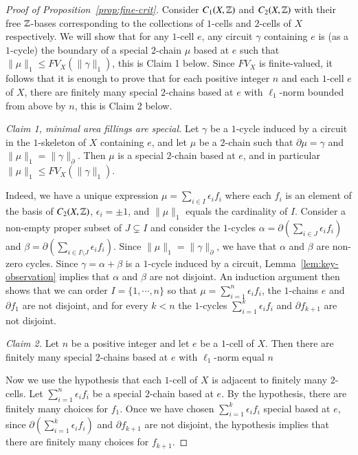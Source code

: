 \begin{proof}[Proof of Proposition~\ref{prop:fine-crit}] 
Consider $C_1(X, \mathbb{Z})$ and $C_2(X, \mathbb{Z})$ with their free $\mathbb{Z}$-bases corresponding to the collections of  $1$-cells and $2$-cells of $X$ respectively.
  We will show that for any  $1$-cell $e$,  any circuit $\gamma$ containing $e$ is (as a $1$-cycle) the boundary of a special $2$-chain $\mu$ based at $e$ such that $\|\mu\|_1\leq FV_X (\|\gamma\|_1)$, this is Claim 1 below. Since $FV_X$ is finite-valued,  it follows  that it is enough to prove that for each positive integer $n$ and each $1$-cell $e$ of $X$, there are finitely many special $2$-chains based at $e$ with $\ell_1$-norm bounded from above by $n$, this is Claim 2 below.

\emph{Claim 1, minimal area fillings are special.} Let $\gamma$ be a $1$-cycle induced by a circuit in the $1$-skeleton of $X$ containing $e$, and let  $\mu$ be a $2$-chain such that  $\partial \mu=\gamma$ and $\|\mu\|_1=\|\gamma\|_\partial $. Then $\mu$ is a special $2$-chain  based at $e$, and in particular $\|\mu\|_1\leq FV_X(\|\gamma\|_1)$.   


Indeed, we have a unique expression $\mu = \sum_{i \in I} \epsilon_i   f_i$ where each $f_i$  is an element of the basis of $C_2(X, \mathbb{Z})$,  $\epsilon_i= \pm 1$, and $\|\mu\|_1$ equals the cardinality of $I$.  Consider a non-empty proper subset of $J\subsetneq I$ and consider the $1$-cycles $\alpha=\partial \left( \sum_{i\in J} \epsilon_i   f_i \right)$ and $\beta = \partial \left ( \sum_{i\in I\setminus J} \epsilon_i    f_i \right )$.  Since $\|\mu\|_1=\|\gamma\|_\partial$, we have that $\alpha$ and $\beta$ are non-zero cycles. Since $\gamma=\alpha+\beta$ is a $1$-cycle induced by a circuit, Lemma~\ref{lem:key-observation} implies that  $\alpha$ and $\beta$ are not disjoint.  An induction argument then shows that we can order $I=\{1,\cdots, n\}$ so that $\mu = \sum_{i =1}^n \epsilon_i  f_i$, the $1$-chains $e$ and $\partial  f_1$ are not disjoint, and  for every $k<n$ the $1$-cycles $\sum_{i=1}^k \epsilon_i   f_i$ and $\partial   f_{k+1}$ are not disjoint. 

\emph{Claim 2.} Let $n$ be a positive integer and let $e$ be a $1$-cell of $X$.  Then there are finitely many special $2$-chains based at $e$ with $\ell_1$-norm equal $n$

Now we use the hypothesis that  each $1$-cell of $X$ is adjacent to finitely many $2$-cells.  Let $\sum_{i =1}^n \epsilon_i   f_i$ be a special $2$-chain based at $e$.  By the hypothesis, there are finitely many choices for $f_1$. Once we have chosen $\sum_{i =1}^k \epsilon_i  f_i$ special based at $e$, since $\partial \left ( \sum_{i =1}^k \epsilon_i   f_i \right)$ and $\partial   f_{k+1}$ are not disjoint, the hypothesis implies that there are finitely many choices for $f_{k+1}$.  
\end{proof} 


